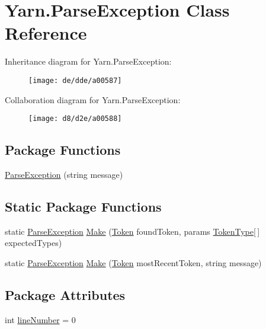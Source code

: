 \hypertarget{a00121}{\section{Yarn.\-Parse\-Exception Class Reference}
\label{a00121}
}


Inheritance diagram for Yarn.\-Parse\-Exception\-:
\nopagebreak
\begin{figure}[H]
\begin{center}
\leavevmode
\texttt{[image: de/dde/a00587]}
\end{center}
\end{figure}


Collaboration diagram for Yarn.\-Parse\-Exception\-:
\nopagebreak
\begin{figure}[H]
\begin{center}
\leavevmode
\texttt{[image: d8/d2e/a00588]}
\end{center}
\end{figure}
\subsection*{Package Functions}
\begin{DoxyCompactItemize}
\item 
\hyperlink{a00121_aa3c4f5c8b0ae86097bbc46044df9f317}{Parse\-Exception} (string message)
\end{DoxyCompactItemize}
\subsection*{Static Package Functions}
\begin{DoxyCompactItemize}
\item 
static \hyperlink{a00121}{Parse\-Exception} \hyperlink{a00121_a511a51bb42dc5bb107eb68f7e5cf5ff1}{Make} (\hyperlink{a00149}{Token} found\-Token, params \hyperlink{a00031_a301aa7c866593a5b625a8fc158bbeace}{Token\-Type}\mbox{[}$\,$\mbox{]} expected\-Types)
\item 
static \hyperlink{a00121}{Parse\-Exception} \hyperlink{a00121_a173f3cabc4741d9d9e016310e90c1c9f}{Make} (\hyperlink{a00149}{Token} most\-Recent\-Token, string message)
\end{DoxyCompactItemize}
\subsection*{Package Attributes}
\begin{DoxyCompactItemize}
\item 
int \hyperlink{a00121_ab335169367e64fd6d89d58b3ac573751}{line\-Number} = 0
\end{DoxyCompactItemize}


